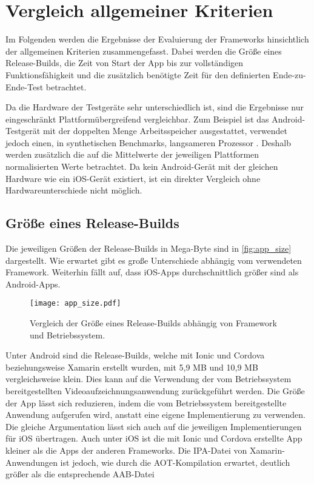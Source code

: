 \section{Vergleich allgemeiner Kriterien}
\label{sec:evaluation_allgemein}

Im Folgenden werden die Ergebnisse der Evaluierung der Frameworks hinsichtlich der allgemeinen Kriterien zusammengefasst.
Dabei werden die Größe eines Release-Builds, die Zeit von Start der App bis zur vollständigen Funktionsfähigkeit und die zusätzlich benötigte Zeit für den definierten Ende-zu-Ende-Test betrachtet.

Da die Hardware der Testgeräte sehr unterschiedlich ist, sind die Ergebnisse nur eingeschränkt Plattformübergreifend vergleichbar.
Zum Beispiel ist das Android-Testgerät mit der doppelten Menge Arbeitsspeicher ausgestattet, verwendet jedoch einen, in synthetischen Benchmarks, langsameren Prozessor \cite{Comparison_Phones}.
Deshalb werden zusätzlich die auf die Mittelwerte der jeweiligen Plattformen normalisierten Werte betrachtet.
Da kein Android-Gerät mit der gleichen Hardware wie ein iOS-Gerät existiert, ist ein direkter Vergleich ohne Hardwareunterschiede nicht möglich.


\subsection{Größe eines Release-Builds}

Die jeweiligen Größen der Release-Builds in Mega-Byte sind in \autoref{fig:app_size} dargestellt.
Wie erwartet gibt es große Unterschiede abhängig vom verwendeten Framework.
Weiterhin fällt auf, dass iOS-Apps durchschnittlich größer sind als Android-Apps.
\begin{figure}[ht]
  \centering 
  \texttt{[image: app\_size.pdf]}
  \caption{Vergleich der Größe eines Release-Builds abhängig von Framework und Betriebssystem.}
  \label{fig:app_size}
\end{figure}

Unter Android sind die Release-Builds, welche mit Ionic und Cordova beziehungsweise Xamarin erstellt wurden, mit 5,9 MB und 10,9 MB vergleichsweise klein.
Dies kann auf die Verwendung der vom Betriebssystem bereitgestellten Videoaufzeichnungsanwendung zurückgeführt werden.
Die Größe der App lässt sich reduzieren, indem die vom Betriebssystem bereitgestellte Anwendung aufgerufen wird, anstatt eine eigene Implementierung zu verwenden.
Die gleiche Argumentation lässt sich auch auf die jeweiligen Implementierungen für iOS übertragen.
Auch unter iOS ist die mit Ionic und Cordova erstellte App kleiner als die Apps der anderen Frameworks.
Die \ac{IPA}-Datei von Xamarin-Anwendungen ist jedoch, wie durch die \ac{AOT}-Kompilation erwartet, deutlich größer als die entsprechende \ac{AAB}-Datei


